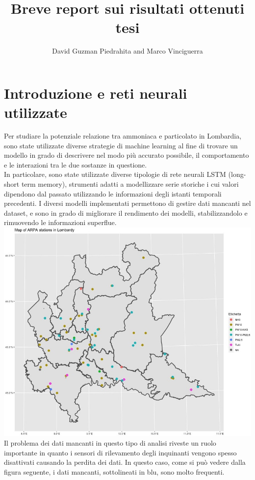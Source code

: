\documentclass{article}
\title{Breve report sui risultati ottenuti tesi}
\author{David Guzman Piedrahita and Marco Vinciguerra}
\begin{document}
 
\maketitle        
\section{Introduzione e reti neurali utilizzate}
Per studiare la potenziale relazione tra ammoniaca e particolato in Lombardia, sono state utilizzate
diverse strategie di machine learning al fine di trovare un modello in grado di descrivere 
nel modo più accurato possibile, il comportamento e le interazioni tra le due 
sostanze in questione. 
\\In particolare, sono state utilizzate diverse tipologie di rete neurali LSTM (long-short term memory),
strumenti adatti a modellizzare serie storiche i cui valori dipendono dal passato utilizzando le informazioni degli
istanti temporali precedenti. I diversi modelli implementati permettono di 
gestire dati mancanti nel dataset, e sono in grado
di migliorare il rendimento dei modelli, stabilizzandolo e rimuovendo le informazioni superflue.
\includegraphics[scale=0.3]{Immagini/mappaTipologie.jpeg}
\\Il problema dei dati mancanti in questo tipo di analisi riveste un ruolo importante
in quanto i sensori di rilevamento degli inquinanti vengono spesso disattivati causando la perdita 
dei dati. In questo caso, come si può vedere dalla figura seguente, i dati mancanti, sottolineati in blu, sono molto frequenti.
\end{document}
